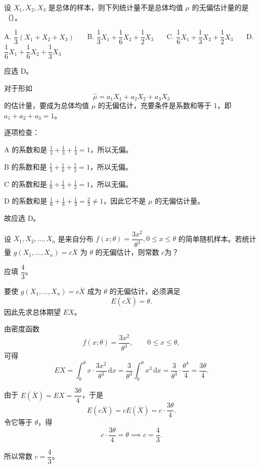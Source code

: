 ﻿\documentclass[lang=cn,11pt]{elegantbook}
\begin{document}
\begin{exercise}\label{exer:7-unbiased-judge}
设 \(X_1, X_2, X_3\) 是总体的样本，则下列统计量不是总体均值 \(\mu\) 的无偏估计量的是（\quad）。\par
A. \(\dfrac{1}{3}(X_1+X_2+X_3)\)~~~ B. \(\dfrac{1}{3}X_1+\dfrac{1}{6}X_2+\dfrac{1}{2}X_3\)~~~
C. \(\dfrac{1}{6}X_1+\dfrac{1}{3}X_2+\dfrac{1}{2}X_3\)~~~ D. \(\dfrac{1}{6}X_1+\dfrac{1}{6}X_2+\dfrac{1}{3}X_3\)
\end{exercise}
\begin{solution}
应选 D。

对于形如
\[
\hat\mu=a_1X_1+a_2X_2+a_3X_3
\]
的估计量，要成为总体均值 \(\mu\) 的无偏估计，充要条件是系数和等于 1，即 \(a_1+a_2+a_3=1\)。

逐项检查：

A 的系数和是 \(\frac13+\frac13+\frac13=1\)，所以无偏。

B 的系数和是 \(\frac13+\frac16+\frac12=1\)，所以无偏。

C 的系数和是 \(\frac16+\frac13+\frac12=1\)，所以无偏。

D 的系数和是 \(\frac16+\frac16+\frac13=\frac23\ne1\)，因此它不是 \(\mu\) 的无偏估计量。

故应选 D。
\end{solution}

\begin{exercise}\label{exer:7-unbiased-c}
设 \(X_1, X_2, \dots, X_n\) 是来自分布 \(f(x;\theta) = \dfrac{3x^2}{\theta^3},0 \leq x \leq \theta\) 的简单随机样本。若统计量 \(g(X_1, \dots, X_n) = c\overline{X}\) 为 \(\theta\) 的无偏估计，则常数 \(c\)为？
\end{exercise}
\begin{solution}
应填 \(\dfrac{4}{3}\)。

要使 \(g(X_1,\dots,X_n)=c\overline{X}\) 成为 \(\theta\) 的无偏估计，必须满足
\[
E(c\overline{X})=\theta.
\]
因此先求总体期望 \(EX\)。

由密度函数
\[
f(x;\theta)=\frac{3x^2}{\theta^3},\qquad 0\le x\le \theta,
\]
可得
\[
EX=\int_0^\theta x\cdot \frac{3x^2}{\theta^3}\,\mathrm dx
=\frac{3}{\theta^3}\int_0^\theta x^3\,\mathrm dx
=\frac{3}{\theta^3}\cdot\frac{\theta^4}{4}
=\frac{3\theta}{4}.
\]

由于 \(E(\overline{X})=EX=\dfrac{3\theta}{4}\)，于是
\[
E(c\overline{X})=cE(\overline{X})=c\cdot\frac{3\theta}{4}.
\]
令它等于 \(\theta\)，得
\[
c\cdot\frac{3\theta}{4}=\theta\implies c=\frac{4}{3}.
\]

所以常数 \(c=\dfrac{4}{3}\)。
\end{solution}
\end{document}
